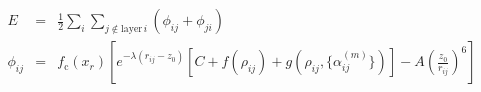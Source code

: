 \documentclass[12pt]{article}
\begin{document}
\begin{eqnarray*}
E &=& \frac{1}{2} \sum_{i} \sum_{j\notin\text{layer}\,i} (\phi_{ij} + \phi_{ji}) \\
\phi_{ij} &=& f_\text{c}(x_r) \left[ e^{-\lambda(r_{ij} - z_0 )} \left[C+f(\rho_{ij})+  g(\rho_{ij}, \{\alpha_{ij}^{(m)}\}) \right]- A\left (\frac{z_0}{r_{ij}} \right)^6 \right] \\
\end{eqnarray*}  



                        
\end{document}
